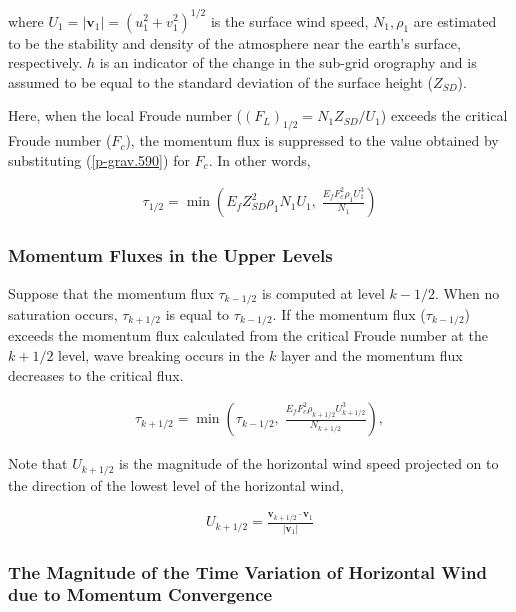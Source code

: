 where \(U_1 = |{\mathbf v}_1| = (u_1^2 + v_1^2)^{1/2}\) is the surface wind speed, \(N_1, \rho_1\) are estimated to be the stability and density of the atmosphere near the earth's surface,
respectively. \(h\) is an indicator of the change in the sub-grid orography and is assumed to be equal to the standard deviation of the surface height (\(Z_{SD}\)).

Here, when the local Froude number (\((F_L)_{1/2} = N_1 Z_{SD}/U_1\)) exceeds the critical Froude number (\(F_c\)), the momentum flux is suppressed to the value obtained by substituting
(\ref{p-grav.590}) for \(F_c\). In other words,

\begin{eqnarray}
  \tau_{1/2} = \min \left(
                   E_f Z_{SD}^{2} \rho_1 N_1 U_1, \;
                  \frac{E_f F_c^{2} \rho_1 U_1^3}{N_1}
               \right)
\end{eqnarray}

\hypertarget{momentum-fluxes-in-the-upper-levels}{%
\subsubsection{Momentum Fluxes in the Upper Levels}\label{momentum-fluxes-in-the-upper-levels}}

Suppose that the momentum flux \(\tau_{k-1/2}\) is computed at level \(k-1/2\). When no saturation occurs, \(\tau_{k+1/2}\) is equal to \(\tau_{k-1/2}\). If the momentum flux (\(\tau_{k-1/2}\))
exceeds the momentum flux calculated from the critical Froude number at the \(k+1/2\) level, wave breaking occurs in the \(k\) layer and the momentum flux decreases to the critical flux.

\begin{eqnarray}
  \tau_{k+1/2} = \min \left(
               \tau_{k-1/2}, \;
               \frac{E_f F_c^2 \rho_{k+1/2} U_{k+1/2}^3}{N_{k+1/2}}
                      \right),
\end{eqnarray}

Note that \(U_{k+1/2}\) is the magnitude of the horizontal wind speed projected on to the direction of the lowest level of the horizontal wind,

\begin{eqnarray}
  U_{k+1/2} = \frac{{\mathbf v}_{k+1/2}
                      \cdot {\mathbf v}_{1}}
                   {|{\mathbf v}_{1}|       }
\end{eqnarray}

\hypertarget{the-magnitude-of-the-time-variation-of-horizontal-wind-due-to-momentum-convergence}{%
\subsubsection{The Magnitude of the Time Variation of Horizontal Wind due to Momentum Convergence}\label{the-magnitude-of-the-time-variation-of-horizontal-wind-due-to-momentum-convergence}}

